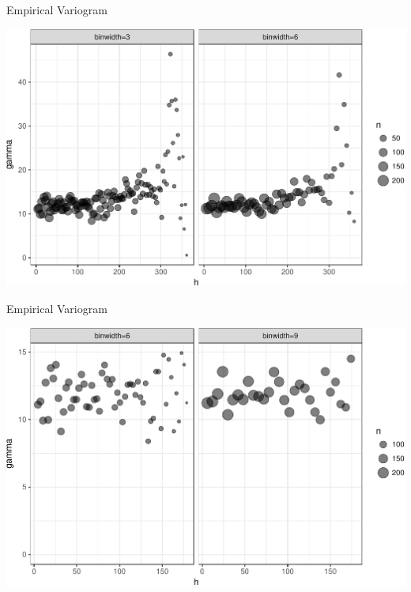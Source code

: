 \documentclass[11pt,ignorenonframetext,]{beamer}
\begin{document}
\begin{frame}{%
\protect\hypertarget{empirical-variogram}{%
Empirical Variogram}}

\begin{center}\includegraphics[width=\textwidth]{Lec13_files/figure-beamer/unnamed-chunk-13-1} \end{center}

\end{frame}

\begin{frame}{%
\protect\hypertarget{empirical-variogram-1}{%
Empirical Variogram}}

\begin{center}\includegraphics[width=\textwidth]{Lec13_files/figure-beamer/unnamed-chunk-14-1} \end{center}

\end{frame}
\end{document}
